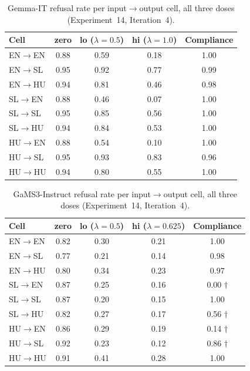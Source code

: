 \documentclass[11pt,letterpaper]{article}
\begin{document}
\begin{table}[!htbp]
\centering
\caption{Gemma-IT refusal rate per input$\to$output cell, all three doses (Experiment~14, Iteration~4).}
\label{tab:gemma_2x3x3}
{\small
\begin{tabular}{lcccc}
\toprule
Cell & zero & lo ($\lambda=0.5$) & hi ($\lambda=1.0$) & Compliance \\
\midrule
EN$\to$EN & 0.88 & 0.59 & 0.18 & 1.00 \\
EN$\to$SL & 0.95 & 0.92 & 0.77 & 0.99 \\
EN$\to$HU & 0.94 & 0.81 & 0.46 & 0.98 \\
SL$\to$EN & 0.88 & 0.46 & 0.07 & 1.00 \\
SL$\to$SL & 0.95 & 0.85 & 0.56 & 1.00 \\
SL$\to$HU & 0.94 & 0.84 & 0.53 & 1.00 \\
HU$\to$EN & 0.88 & 0.54 & 0.10 & 1.00 \\
HU$\to$SL & 0.95 & 0.93 & 0.83 & 0.96 \\
HU$\to$HU & 0.94 & 0.80 & 0.55 & 1.00 \\
\bottomrule
\end{tabular}
}
\end{table}

\begin{table}[!htbp]
\centering
\caption{GaMS3-Instruct refusal rate per input$\to$output cell, all three doses (Experiment~14, Iteration~4).}
\label{tab:gams_2x3x3}
{\small
\begin{tabular}{lcccc}
\toprule
Cell & zero & lo ($\lambda=0.5$) & hi ($\lambda=0.625$) & Compliance \\
\midrule
EN$\to$EN & 0.82 & 0.30 & 0.21 & 1.00 \\
EN$\to$SL & 0.77 & 0.21 & 0.14 & 0.98 \\
EN$\to$HU & 0.80 & 0.34 & 0.23 & 0.97 \\
SL$\to$EN & 0.87 & 0.25 & 0.16 & 0.00 $\dagger$ \\
SL$\to$SL & 0.87 & 0.20 & 0.15 & 1.00 \\
SL$\to$HU & 0.82 & 0.27 & 0.17 & 0.56 $\dagger$ \\
HU$\to$EN & 0.86 & 0.29 & 0.19 & 0.14 $\dagger$ \\
HU$\to$SL & 0.92 & 0.23 & 0.12 & 0.86 $\dagger$ \\
HU$\to$HU & 0.91 & 0.41 & 0.28 & 1.00 \\
\bottomrule
\end{tabular}
}
\end{table}
\end{document}
